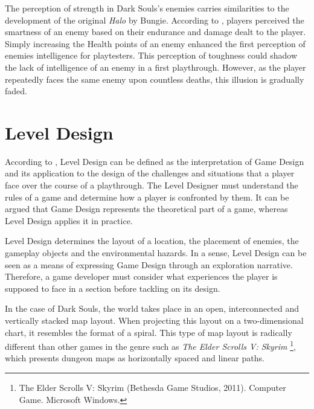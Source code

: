 The perception of strength in Dark Souls's enemies carries similarities to the development of the original \emph{Halo} by Bungie. According to , players perceived the smartness of an enemy based on their endurance and damage dealt to the player. Simply increasing the Health points of an enemy enhanced the first perception of enemies intelligence for playtesters. This perception of toughness could shadow the lack of intelligence of an enemy in a first playthrough. However, as the player repeatedly faces the same enemy upon countless deaths, this illusion is gradually faded.


\section{Level Design}
\label{sec:level-design-dark-souls}

According to \cite{BOOK_LevelDesignConcept}, Level Design can be defined as the interpretation of Game Design and its application to the design of the challenges and situations that a player face over the course of a playthrough. The Level Designer must understand the rules of a game and determine how a player is confronted by them. It can be argued that Game Design represents the theoretical part of a game, whereas Level Design applies it in practice.

Level Design determines the layout of a location, the placement of enemies, the gameplay objects and the environmental hazards. In a sense, Level Design can be seen as a means of expressing Game Design through an exploration narrative. Therefore, a game developer must consider what experiences the player is supposed to face in a section before tackling on its design.

In the case of Dark Souls, the world takes place in an open, interconnected and vertically stacked map layout. When projecting this layout on a two-dimensional chart, it resembles the format of a spiral. This type of map layout is radically different than other games in the genre such as \emph{The Elder Scrolls V: Skyrim} \footnote{The Elder Scrolls V: Skyrim (Bethesda Game Studios, 2011). Computer Game. Microsoft Windows.}, which presents dungeon maps as horizontally spaced and linear paths.

